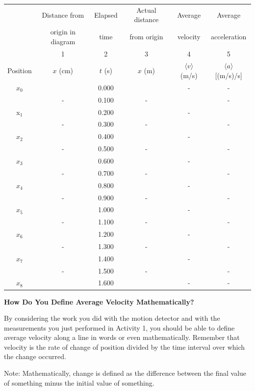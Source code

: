 \vspace{0.3cm}
{\centering \begin{tabular}{|c|c|c|c|c|c|}
\hline 
&
Distance from&
Elapsed &
Actual distance&
Average&
Average\\
&
origin in diagram&
time&
from origin&
velocity&
acceleration\\
&
1&
2&
3&
4&
5\\
Position&
$x$ (cm)&
$t$ (s)&
$x$ (m)&
$\langle v\rangle$ (m/s)&
$\langle a\rangle$ [(m/s)/s]\\
\hline 
\hline 
\( x_{0} \)&
&
0.000&
&
-&
-\\
\hline 
&
-&
0.100&
-&
&
-\\
\hline 
x\( _{1} \)&
&
0.200&
&
-&
\\
\hline 
&
-&
0.300&
-&
&
-\\
\hline 
\( x_{2} \)&
&
0.400&
&
-&
\\
\hline 
&
-&
0.500&
-&
&
-\\
\hline 
\( x_{3} \)&
&
0.600&
&
-&
\\
\hline 
&
-&
0.700&
-&
&
-\\
\hline 
\( x_{4} \)&
&
0.800&
&
-&
\\
\hline 
&
-&
0.900&
-&
&
-\\
\hline 
\( x_{5} \)&
&
1.000&
&
-&
\\
\hline 
&
-&
1.100&
-&
&
-\\
\hline 
\( x_{6} \)&
&
1.200&
&
-&
\\
\hline 
&
-&
1.300&
-&
&
-\\
\hline 
\( x_{7} \)&
&
1.400&
&
-&
\\
\hline 
&
-&
1.500&
-&
&
-\\
\hline 
\( x_{8} \)&
&
1.600&
&
-&
-\\
\hline 
\end{tabular}\par}
\vspace{0.3cm}

\textbf{How Do You Define Average Velocity Mathematically?}

By considering the work you did with the motion detector and with the measurements
you just performed in Activity 1, you should be able to define average velocity
along a line in words or even mathematically. Remember that velocity is the
rate of change of position divided by the time interval over which the change
occurred. 

Note: Mathematically, change is defined as the difference between the final
value of something minus the initial value of something.

